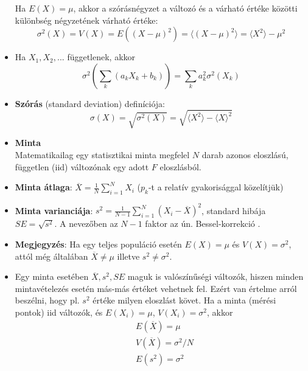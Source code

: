 \documentclass[12pt]{article}
\theoremstyle{plain}
\begin{document}
\begin{itemize}
    Ha $E(X)=\mu$, akkor a szórásnégyzet a változó és a várható értéke közötti különbség négyzetének várható értéke:
    \begin{equation*}
        \sigma^2(X) = V(X) = E((X-\mu)^2) = \langle (X-\mu)^2 \rangle = \langle X^2 \rangle - \mu^2
    \end{equation*}
    \item Ha $X_1, X_2, ...$ függetlenek, akkor 
        \begin{equation*}
            \sigma^2\left( \sum\limits_k(a_kX_k + b_k) \right) = \sum\limits_k a_k^2\sigma^2(X_k)
        \end{equation*}
    \item \textbf{Szórás} (standard deviation) definíciója:
        \begin{equation*}
            \sigma(X) = \sqrt{\sigma^2(X)} = \sqrt{\langle X^2 \rangle - \langle X \rangle^2}
        \end{equation*}
    \item \textbf{Minta}\\
    Matematikailag egy statisztikai minta megfelel $N$ darab azonos eloszlású, független (iid) változónak egy adott $F$ eloszlásból.
    \item \textbf{Minta átlaga}: ${\displaystyle\overline{X} = \frac{1}{N}\sum\limits_{i=1}^{N}X_i}$ ($p_k$-t a relatív gyakorisággal közelítjük)
    \item \textbf{Minta varianciája}: ${\displaystyle s^2 = \frac{1}{N-1}\sum\limits_{i=1}^{N}(X_i-\overline{X})^2}$,
    standard hibája $SE = \sqrt{s^2}$. A nevezőben az $N-1$ faktor az ún. Bessel-korrekció \cite{besselcorr}.
    \item \textbf{Megjegyzés}: Ha egy teljes populáció esetén $E(X)=\mu$ és $V(X)=\sigma^2$, attól még általában
    $\overline{X}\neq\mu$ illetve $s^2\neq\sigma^2$.
    \item Egy minta esetében $\overline{X}, s^2, SE$ maguk is valószínűségi változók, hiszen minden mintavételezés esetén más-más
    értéket vehetnek fel. Ezért van értelme arról beszélni, hogy pl. $s^2$ értéke milyen eloszlást követ.
    Ha a minta (mérési pontok) iid változók, és $E(X_i)=\mu$, $V(X_i)=\sigma^2$, akkor 
    \begin{align*}
        & E(\overline{X}) = \mu \\
        & V(\overline{X}) = \sigma^2/N \\
        & E(s^2) = \sigma^2
    \end{align*}
\end{itemize}
\end{document}
